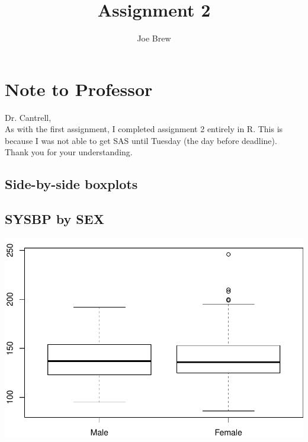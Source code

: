 \documentclass{article}
\title{Assignment 2}
\author{Joe Brew}
\begin{document}

\maketitle



\section*{Note to Professor}
Dr. Cantrell,
\\ 
As with the first assignment, I completed assignment 2 entirely in R.  This is because I was not able to get SAS until Tuesday (the day before deadline).  Thank you for your understanding.

\vspace{50mm}

\tableofcontents
{}

\begin{center}
\section*{Side-by-side boxplots}
\end{center}

\subsection*{SYSBP by SEX}
\begin{center}
\includegraphics{ass2-002}
\end{center}
\end{document}
